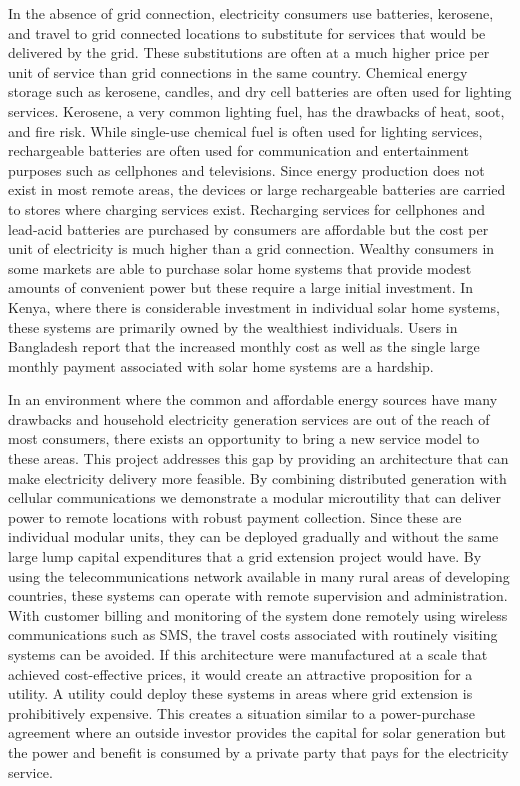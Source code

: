 \documentclass[conference]{IEEEtran}
\begin{document}

In the absence of grid connection, electricity consumers use
batteries, kerosene, and travel to grid connected locations to
substitute for services that would be delivered by the grid.
These substitutions are often at a much higher price per unit
of service than grid
connections in the same country.\cite{evan mills}
Chemical energy storage such as kerosene, candles, and dry cell batteries 
are often used for lighting services.
Kerosene, a very common lighting fuel, has the drawbacks of heat, 
soot, and fire risk.
While single-use chemical fuel is often used for lighting services, 
rechargeable batteries are often used for communication and 
entertainment purposes such as cellphones and televisions.
Since energy production does not exist in most remote areas, the 
devices or large rechargeable batteries are carried to stores
where charging services exist.
Recharging services for cellphones and lead-acid batteries are
purchased by consumers are affordable but the cost per unit of 
electricity is much higher than a grid connection.
Wealthy consumers in some markets are able to purchase
solar home systems that provide modest amounts of convenient
power but these require a large initial investment.
In Kenya, where there is considerable investment in individual
solar home systems, these systems are primarily owned by the
wealthiest individuals.\cite{Jacobson:Connective}
Users in Bangladesh report that the increased monthly cost
as well as the single large monthly payment associated with
solar home systems are a hardship.
\cite{Mondal:SHSBangladesh:2011}

In an environment where the common and affordable energy sources have
many drawbacks and household electricity generation services are 
out of the reach
of most consumers, there exists an opportunity to bring a 
new service model to these areas.
This project addresses this gap by providing an architecture 
that can make electricity delivery more feasible.
By combining distributed generation with cellular communications
we demonstrate a modular microutility that can deliver power to
remote locations with robust payment collection.
Since these are individual modular units, they can be 
deployed gradually and without the same large lump 
capital expenditures that a 
grid extension project would have.
By using the telecommunications network available in many rural
areas of developing countries, these systems can operate with
remote supervision and administration.
With customer billing and monitoring of the system done remotely
using wireless communications such as SMS, the travel costs
associated with routinely visiting systems can be avoided.
If this architecture were manufactured at a scale that achieved 
cost-effective prices, it would create an attractive 
proposition for a utility.
A utility could
deploy these systems in areas where grid extension is prohibitively expensive.	
This creates a situation similar to
a power-purchase agreement where an outside investor provides the
capital for solar generation but the power and benefit is consumed
by a private party that pays for the electricity service.
\end{document}
